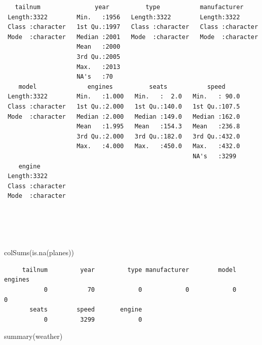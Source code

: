\documentclass[
  10pt,
  letterpaper,
  DIV=11,
  numbers=noendperiod]{scrartcl}
\newenvironment{Shaded}{\begin{snugshade}}{\end{snugshade}}
\newcommand{\FunctionTok}[1]{\textcolor[rgb]{0.28,0.35,0.67}{#1}}
\newcommand{\NormalTok}[1]{\textcolor[rgb]{0.00,0.23,0.31}{#1}}
\begin{document}
\begin{verbatim}
   tailnum               year          type           manufacturer      
 Length:3322        Min.   :1956   Length:3322        Length:3322       
 Class :character   1st Qu.:1997   Class :character   Class :character  
 Mode  :character   Median :2001   Mode  :character   Mode  :character  
                    Mean   :2000                                        
                    3rd Qu.:2005                                        
                    Max.   :2013                                        
                    NA's   :70                                          
    model              engines          seats           speed      
 Length:3322        Min.   :1.000   Min.   :  2.0   Min.   : 90.0  
 Class :character   1st Qu.:2.000   1st Qu.:140.0   1st Qu.:107.5  
 Mode  :character   Median :2.000   Median :149.0   Median :162.0  
                    Mean   :1.995   Mean   :154.3   Mean   :236.8  
                    3rd Qu.:2.000   3rd Qu.:182.0   3rd Qu.:432.0  
                    Max.   :4.000   Max.   :450.0   Max.   :432.0  
                                                    NA's   :3299   
    engine         
 Length:3322       
 Class :character  
 Mode  :character  
                   
                   
                   
                   
\end{verbatim}

\begin{Shaded}
\begin{Highlighting}[numbers=left,,]
\FunctionTok{colSums}\NormalTok{(}\FunctionTok{is.na}\NormalTok{(planes))}
\end{Highlighting}
\end{Shaded}

\begin{verbatim}
     tailnum         year         type manufacturer        model      engines 
           0           70            0            0            0            0 
       seats        speed       engine 
           0         3299            0 
\end{verbatim}

\begin{Shaded}
\begin{Highlighting}[numbers=left,,]
\FunctionTok{summary}\NormalTok{(weather)}
\end{Highlighting}
\end{Shaded}
\end{document}
